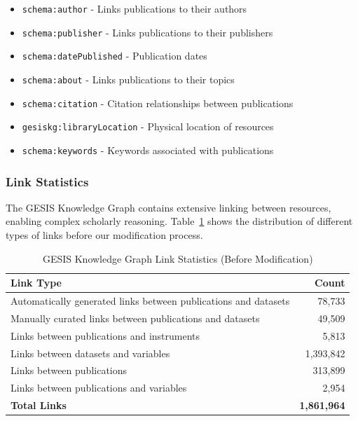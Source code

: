 \begin{itemize}
    \item \texttt{schema:author} - Links publications to their authors
    \item \texttt{schema:publisher} - Links publications to their publishers
    \item \texttt{schema:datePublished} - Publication dates
    \item \texttt{schema:about} - Links publications to their topics
    \item \texttt{schema:citation} - Citation relationships between publications
    \item \texttt{gesiskg:libraryLocation} - Physical location of resources
    \item \texttt{schema:keywords} - Keywords associated with publications
\end{itemize}

\subsubsection{Link Statistics}
The GESIS Knowledge Graph contains extensive linking between resources, enabling complex scholarly reasoning. Table~\ref{table-gesis-links} shows the distribution of different types of links before our modification process.

\begin{table}[htbp]
\centering
\renewcommand{\arraystretch}{1.15}
\setlength{\tabcolsep}{12pt}
\caption{GESIS Knowledge Graph Link Statistics (Before Modification)}
\begin{tabular}{| l | r |}
\hline
\textbf{Link Type} & \textbf{Count} \\
\hline
Automatically generated links between publications and datasets & 78,733 \\
Manually curated links between publications and datasets & 49,509 \\
Links between publications and instruments & 5,813 \\
Links between datasets and variables & 1,393,842 \\
Links between publications & 313,899 \\
Links between publications and variables & 2,954 \\
\hline
\textbf{Total Links} & \textbf{1,861,964} \\
\hline
\end{tabular}
\label{table-gesis-links}
\end{table}

